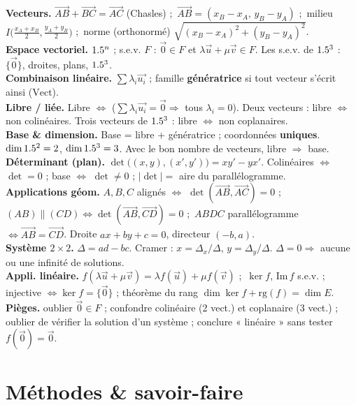\begin{synthese}
\textbf{Vecteurs.} $\vec{AB}+\vec{BC}=\vec{AC}$ (Chasles) ;\ $\vec{AB}=(x_B-x_A,\,y_B-y_A)$ ;\
milieu $I\big(\tfrac{x_A+x_B}2,\tfrac{y_A+y_B}2\big)$ ;\ norme (orthonormé)
$\sqrt{(x_B-x_A)^2+(y_B-y_A)^2}$.\\[4pt]
\textbf{Espace vectoriel.} $1.5^n$ ; s.e.v. $F$ : $\vec0\in F$ et $\lambda\vec u+\mu\vec v\in F$.
Les s.e.v. de $1.5^3$ : $\{\vec0\}$, droites, plans, $1.5^3$.\\[4pt]
\textbf{Combinaison linéaire.} $\sum\lambda_i\vec{u_i}$ ; famille \textbf{génératrice} si tout
vecteur s'écrit ainsi ($\mathrm{Vect}$).\\[4pt]
\textbf{Libre / liée.} Libre $\Leftrightarrow$ ($\sum\lambda_i\vec{u_i}=\vec0\Rightarrow$ tous
$\lambda_i=0$). Deux vecteurs : libre $\Leftrightarrow$ non colinéaires. Trois vecteurs de $1.5^3$ :
libre $\Leftrightarrow$ non coplanaires.\\[4pt]
\textbf{Base \& dimension.} Base = libre + génératrice ; coordonnées \textbf{uniques}.
$\dim1.5^2=2$, $\dim1.5^3=3$. Avec le bon nombre de vecteurs, libre $\Rightarrow$ base.\\[4pt]
\textbf{Déterminant (plan).} $\det\big((x,y),(x',y')\big)=xy'-yx'$. Colinéaires $\Leftrightarrow$
$\det=0$ ; base $\Leftrightarrow$ $\det\neq0$ ; $|\det|=$ aire du parallélogramme.\\[4pt]
\textbf{Applications géom.} $A,B,C$ alignés $\Leftrightarrow$ $\det(\vec{AB},\vec{AC})=0$ ;
$(AB)\parallel(CD)\Leftrightarrow\det(\vec{AB},\vec{CD})=0$ ;\ $ABDC$ parallélogramme
$\Leftrightarrow\vec{AB}=\vec{CD}$. Droite $ax+by+c=0$, directeur $(-b,a)$.\\[4pt]
\textbf{Système $2\times2$.} $\Delta=ad-bc$. Cramer : $x=\Delta_x/\Delta$, $y=\Delta_y/\Delta$.
$\Delta=0\Rightarrow$ aucune ou une infinité de solutions.\\[4pt]
\textbf{Appli. linéaire.} $f(\lambda\vec u+\mu\vec v)=\lambda f(\vec u)+\mu f(\vec v)$ ;\
$\ker f$, $\mathrm{Im}\,f$ s.e.v. ; injective $\Leftrightarrow\ker f=\{\vec0\}$ ; théorème du rang
$\dim\ker f+\mathrm{rg}(f)=\dim E$.\\[4pt]
\textbf{Pièges.} oublier $\vec0\in F$ ; confondre colinéaire (2 vect.) et coplanaire (3 vect.) ;
oublier de vérifier la solution d'un système ; conclure « linéaire » sans tester $f(\vec0)=\vec0$.
\end{synthese}

\section{Méthodes \& savoir-faire}

